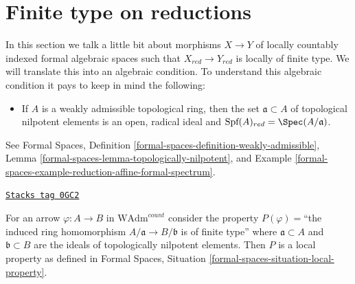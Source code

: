 \section{Finite type on reductions}
\label{restricted-section-finite-type-red}
In this section we talk a little bit about morphisms $X \to Y$
of locally countably indexed formal algebraic spaces such that
$X_{red} \to Y_{red}$ is locally of finite type. We will translate
this into an algebraic condition. To understand this algebraic
condition it pays to keep in mind the following:
\begin{itemize}
\item If $A$ is a weakly admissible topological ring, then the
set $\mathfrak a \subset A$ of topological nilpotent elements
is an open, radical ideal and
$\text{Spf}(A)_{red} = \Spec(A/\mathfrak a)$.
\end{itemize}
See Formal Spaces, Definition
\ref{formal-spaces-definition-weakly-admissible},
Lemma \ref{formal-spaces-lemma-topologically-nilpotent}, and
Example \ref{formal-spaces-example-reduction-affine-formal-spectrum}.

\begin{lemma}
\label{restricted-lemma-finite-type-red}
\href{https://stacks.math.columbia.edu/tag/0GC2}{\texttt{Stacks tag 0GC2}}

For an arrow $\varphi : A \to B$ in $\text{WAdm}^{count}$ consider
the property $P(\varphi)=$``the induced ring homomorphism
$A/\mathfrak a \to B/\mathfrak b$ is of finite type''
where $\mathfrak a \subset A$ and $\mathfrak b \subset B$ are the ideals
of topologically nilpotent elements. Then $P$ is a local property
as defined in
Formal Spaces, Situation
\ref{formal-spaces-situation-local-property}.
\end{lemma}

